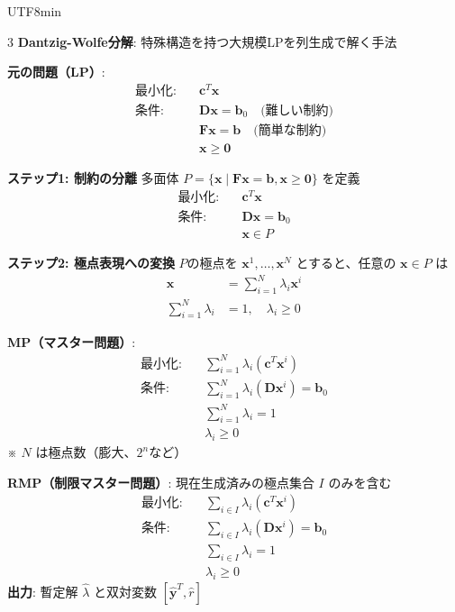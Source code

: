 \documentclass[8pt,a4paper]{article}
\begin{document}
\begin{CJK}{UTF8}{min}
\begin{multicols}{3}
\textbf{Dantzig-Wolfe分解}: 特殊構造を持つ大規模LPを列生成で解く手法

\textbf{元の問題（LP）}:
\begin{align*}
\text{最小化:} \quad & \boldsymbol{c}^T \boldsymbol{x} \\
\text{条件:} \quad & \boldsymbol{D}\boldsymbol{x} = \boldsymbol{b}_0 \quad \text{(難しい制約)} \\
& \boldsymbol{F}\boldsymbol{x} = \boldsymbol{b} \quad \text{(簡単な制約)} \\
& \boldsymbol{x} \geq \mathbf{0}
\end{align*}

\textbf{ステップ1: 制約の分離}
多面体 $P = \{\boldsymbol{x} \mid \boldsymbol{F}\boldsymbol{x} = \boldsymbol{b}, \boldsymbol{x} \geq \mathbf{0}\}$ を定義
\begin{align*}
\text{最小化:} \quad & \boldsymbol{c}^T \boldsymbol{x} \\
\text{条件:} \quad & \boldsymbol{D}\boldsymbol{x} = \boldsymbol{b}_0 \\
& \boldsymbol{x} \in P
\end{align*}

\textbf{ステップ2: 極点表現への変換}
$P$の極点を $\boldsymbol{x}^1, \ldots, \boldsymbol{x}^N$ とすると、任意の $\boldsymbol{x} \in P$ は
\begin{align*}
\boldsymbol{x} &= \sum_{i=1}^N \lambda_i \boldsymbol{x}^i \\
\sum_{i=1}^N \lambda_i &= 1, \quad \lambda_i \geq 0
\end{align*}

\textbf{MP（マスター問題）}:
\begin{align*}
\text{最小化:} \quad & \sum_{i=1}^N \lambda_i (\boldsymbol{c}^T \boldsymbol{x}^i) \\
\text{条件:} \quad & \sum_{i=1}^N \lambda_i (\boldsymbol{D}\boldsymbol{x}^i) = \boldsymbol{b}_0 \\
& \sum_{i=1}^N \lambda_i = 1 \\
& \lambda_i \geq 0
\end{align*}
※ $N$ は極点数（膨大、$2^n$など）

\textbf{RMP（制限マスター問題）}: 現在生成済みの極点集合 $I$ のみを含む
\begin{align*}
\text{最小化:} \quad & \sum_{i \in I} \lambda_i (\boldsymbol{c}^T \boldsymbol{x}^i) \\
\text{条件:} \quad & \sum_{i \in I} \lambda_i (\boldsymbol{D}\boldsymbol{x}^i) = \boldsymbol{b}_0 \\
& \sum_{i \in I} \lambda_i = 1 \\
& \lambda_i \geq 0
\end{align*}
\textbf{出力}: 暫定解 $\hat{\lambda}$ と双対変数 $[\hat{\boldsymbol{y}}^T, \hat{r}]$


\end{multicols}
\end{CJK}
\end{document}
